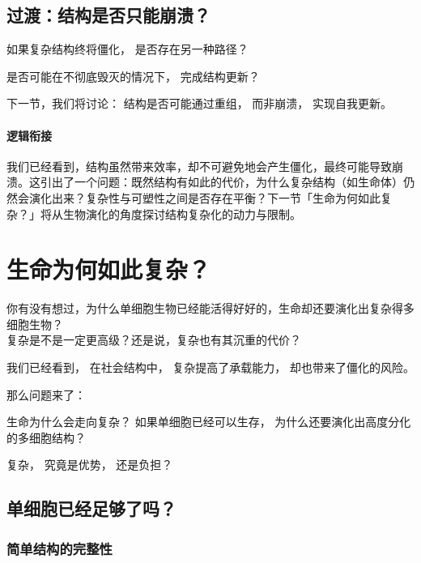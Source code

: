 \documentclass[../main.tex]{subfiles}
\begin{document}
\subsection{过渡：结构是否只能崩溃？}

如果复杂结构终将僵化，
是否存在另一种路径？

是否可能在不彻底毁灭的情况下，
完成结构更新？

下一节，我们将讨论：
结构是否可能通过重组，
而非崩溃，
实现自我更新。


\paragraph*{逻辑衔接}
我们已经看到，结构虽然带来效率，却不可避免地会产生僵化，最终可能导致崩溃。这引出了一个问题：既然结构有如此的代价，为什么复杂结构（如生命体）仍然会演化出来？复杂性与可塑性之间是否存在平衡？下一节「生命为何如此复杂？」将从生物演化的角度探讨结构复杂化的动力与限制。

\section{生命为何如此复杂？}
\label{sec:cases}

\begin{readingnote}
	你有没有想过，为什么单细胞生物已经能活得好好的，生命却还要演化出复杂得多细胞生物？\\
	复杂是不是一定更高级？还是说，复杂也有其沉重的代价？
\end{readingnote}

\begin{motivation}
	我们已经看到，
	在社会结构中，
	复杂提高了承载能力，
	却也带来了僵化的风险。
	
	那么问题来了：
	
	生命为什么会走向复杂？
	如果单细胞已经可以生存，
	为什么还要演化出高度分化的多细胞结构？
	
	复杂，
	究竟是优势，
	还是负担？
\end{motivation}

\subsection{单细胞已经足够了吗？}

\subsubsection{简单结构的完整性}
\end{document}
